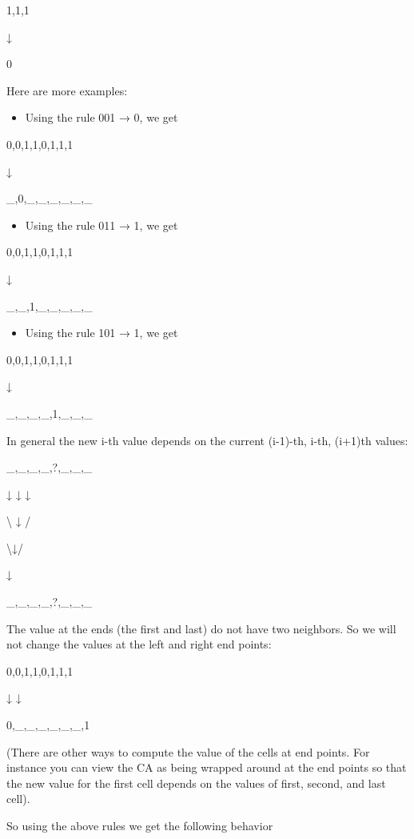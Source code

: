 \documentclass[
]{article}
\providecommand{\tightlist}{%
  \setlength{\itemsep}{0pt}\setlength{\parskip}{0pt}}
\begin{document}
1,1,1

↓

0

Here are more examples:

\begin{itemize}
\tightlist
\item
  Using the rule 001 → 0, we get
\end{itemize}

0,0,1,1,0,1,1,1

↓

\_,0,\_,\_,\_,\_,\_,\_

\begin{itemize}
\tightlist
\item
  Using the rule 011 → 1, we get
\end{itemize}

0,0,1,1,0,1,1,1

↓

\_,\_,1,\_,\_,\_,\_,\_

\begin{itemize}
\tightlist
\item
  Using the rule 101 → 1, we get
\end{itemize}

0,0,1,1,0,1,1,1

↓

\_,\_,\_,\_,1,\_,\_,\_

In general the new i-th value depends on the current (i-1)-th, i-th,
(i+1)th values:

\_,\_,\_,\_,?,\_,\_,\_

↓ ↓ ↓

\textbackslash{} ↓ /

\textbackslash↓/

↓

\_,\_,\_,\_,?,\_,\_,\_

The value at the ends (the first and last) do not have two neighbors. So
we will not change the values at the left and right end points:

0,0,1,1,0,1,1,1

↓ ↓

0,\_,\_,\_,\_,\_,\_,1

(There are other ways to compute the value of the cells at end points.
For instance you can view the CA as being wrapped around at the end
points so that the new value for the first cell depends on the values of
first, second, and last cell).

So using the above rules we get the following behavior
\end{document}
